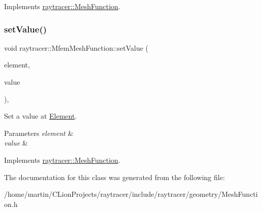 Implements \hyperlink{classraytracer_1_1MeshFunction_a49888c1924a473a1d98564a4732edd3a}{raytracer\+::\+Mesh\+Function}.

\mbox{\label{classraytracer_1_1MfemMeshFunction_aa7c06ea3f585a45573174b073da58ee1}} 
\subsubsection{\texorpdfstring{set\+Value()}{setValue()}}
{\footnotesize\ttfamily void raytracer\+::\+Mfem\+Mesh\+Function\+::set\+Value (\begin{DoxyParamCaption}\item[{const \hyperlink{classraytracer_1_1Element}{Element} \&}]{element,  }\item[{double}]{value }\end{DoxyParamCaption})\hspace{0.3cm}{\ttfamily [override]}, {\ttfamily [virtual]}}



Set a value at \hyperlink{classraytracer_1_1Element}{Element}. 


\begin{DoxyParams}{Parameters}
{\em element} & \\
\hline
{\em value} & \\
\hline
\end{DoxyParams}


Implements \hyperlink{classraytracer_1_1MeshFunction_a0d71fc5b456edd7a89267a071ae6dd81}{raytracer\+::\+Mesh\+Function}.



The documentation for this class was generated from the following file\+:\begin{DoxyCompactItemize}
\item 
/home/martin/\+C\+Lion\+Projects/raytracer/include/raytracer/geometry/Mesh\+Function.\+h\end{DoxyCompactItemize}
